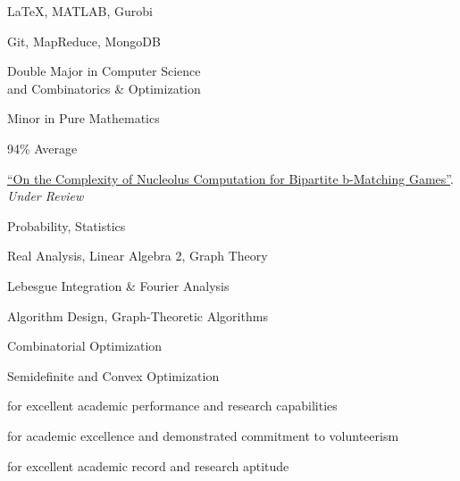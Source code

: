 \documentclass[10pt,a4paper,ragged2e]{altacv}
\begin{document}
\begin{paracol}{2}
\smallskip

\LaTeX, MATLAB, Gurobi

\divider\smallskip

Git, MapReduce, MongoDB

Double Major in Computer Science\\
and Combinatorics \& Optimization

\smallskip

Minor in Pure Mathematics

\smallskip

94\% Average

\href{https://arxiv.org/abs/2105.07161}{``On the Complexity of Nucleolus Computation for Bipartite b-Matching Games''}.
\emph{Under Review}

Probability, Statistics

\smallskip

Real Analysis, Linear Algebra 2, Graph Theory

\smallskip

Lebesgue Integration \& Fourier Analysis

\divider\smallskip

Algorithm Design, Graph-Theoretic Algorithms


\smallskip

Combinatorial Optimization

\smallskip

Semidefinite and Convex Optimization


for excellent academic performance and research capabilities

\divider\smallskip

for academic excellence and demonstrated commitment to volunteerism

\divider\smallskip

for excellent academic record and research aptitude

\divider\smallskip


\iffalse
\divider\smallskip

\cvevent{President's Scholarship of Distinction}{University of Waterloo}{September 2017}{}
for entrance average above 95\%
\fi

\end{paracol}
\end{document}
